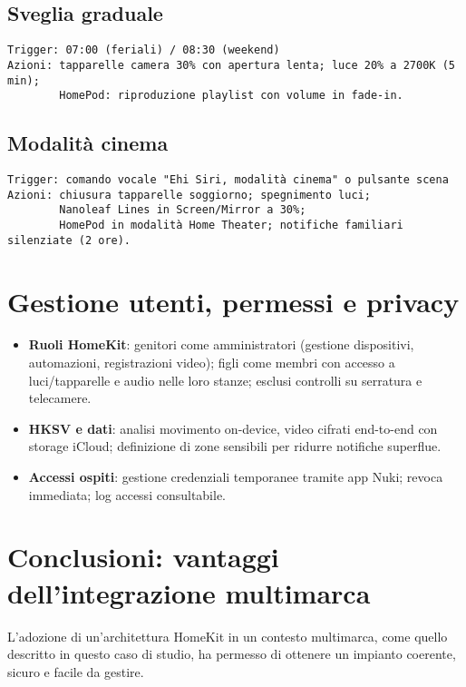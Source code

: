\subsection*{Sveglia graduale}
\begin{verbatim}
Trigger: 07:00 (feriali) / 08:30 (weekend)
Azioni: tapparelle camera 30% con apertura lenta; luce 20% a 2700K (5 min);
        HomePod: riproduzione playlist con volume in fade-in.
\end{verbatim}

\subsection*{Modalità cinema}
\begin{verbatim}
Trigger: comando vocale "Ehi Siri, modalità cinema" o pulsante scena
Azioni: chiusura tapparelle soggiorno; spegnimento luci;
        Nanoleaf Lines in Screen/Mirror a 30%;
        HomePod in modalità Home Theater; notifiche familiari silenziate (2 ore).
\end{verbatim}

\section{Gestione utenti, permessi e privacy}
\begin{itemize}
  \item \textbf{Ruoli HomeKit}: genitori come amministratori (gestione dispositivi, automazioni, registrazioni video); figli come membri con accesso a luci/tapparelle e audio nelle loro stanze; esclusi controlli su serratura e telecamere.
  \item \textbf{HKSV e dati}: analisi movimento on-device, video cifrati end-to-end con storage iCloud; definizione di zone sensibili per ridurre notifiche superflue.
  \item \textbf{Accessi ospiti}: gestione credenziali temporanee tramite app Nuki; revoca immediata; log accessi consultabile.
\end{itemize}

\section{Conclusioni: vantaggi dell'integrazione multimarca}
L'adozione di un'architettura HomeKit in un contesto multimarca, come quello descritto in questo caso di studio, ha permesso di ottenere un impianto coerente, sicuro e facile da gestire.

